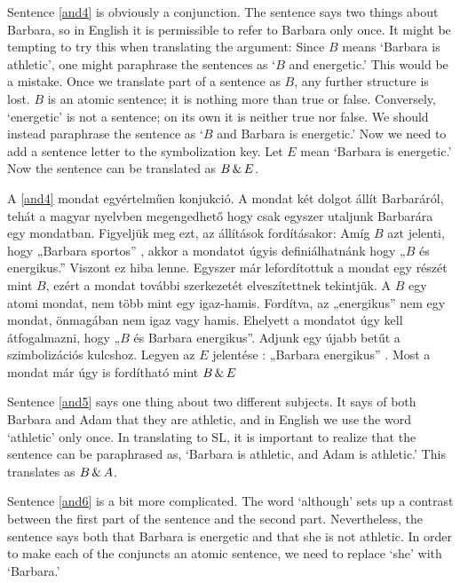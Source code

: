 Sentence \ref{and4} is obviously a conjunction. 
The sentence says two things about Barbara, so in English it is permissible to refer to Barbara only once. 
It might be tempting to try this when translating the argument: Since $B$ means `Barbara is athletic', one might paraphrase the sentences as `$B$ and energetic.' 
This would be a mistake. 
Once we translate part of a sentence as $B$, any further structure is lost.
$B$ is an atomic sentence; it is nothing more than true or false. 
Conversely, `energetic' is not a sentence; on its own it is neither true nor false.
We should instead paraphrase the sentence as `$B$ and Barbara is energetic.' 
Now we need to add a sentence letter to the symbolization key. 
Let $E$ mean `Barbara is energetic.' Now the sentence can be translated as $B\,\&\, E$.

A \ref{and4} mondat egyértelműen konjukció. 
A mondat két dolgot állít Barbaráról, tehát a magyar nyelvben megengedhető hogy csak egyszer utaljunk Barbarára egy mondatban.
Figyeljük meg ezt, az állítások fordításakor: Amíg $B$ azt jelenti, hogy „Barbara sportos” ,  akkor a mondatot úgyis definiálhatnánk hogy „$B$ és energikus.” 
Viszont ez hiba lenne. 
Egyszer már lefordítottuk a mondat egy részét mint $B$, ezért a mondat további szerkezetét elveszítettnek tekintjük.
A $B$ egy atomi mondat, nem több mint egy igaz-hamis. 
Fordítva, az „energikus” nem egy mondat, önmagában nem igaz vagy hamis. 
Ehelyett a mondatot úgy kell átfogalmazni, hogy „$B$ és Barbara energikus”.
Adjunk egy újabb betűt a szimbolizációs kulcshoz. 
Legyen az $E$ jelentése : „Barbara energikus” .
Most a mondat már úgy is fordítható mint $B\,\&\, E$



Sentence \ref{and5} says one thing about two different subjects. It says of both Barbara and Adam that they are athletic, and in English we use the word `athletic' only once. In translating to SL, it is important to realize that the sentence can be paraphrased as, `Barbara is athletic, and Adam is athletic.' This translates as $B\,\&\, A$.

Sentence \ref{and6} is a bit more complicated. The word `although' sets up a contrast between the first part of the sentence and the second part. Nevertheless, the sentence says both that Barbara is energetic and that she is not athletic. In order to make each of the conjuncts an atomic sentence, we need to replace `she' with `Barbara.'

